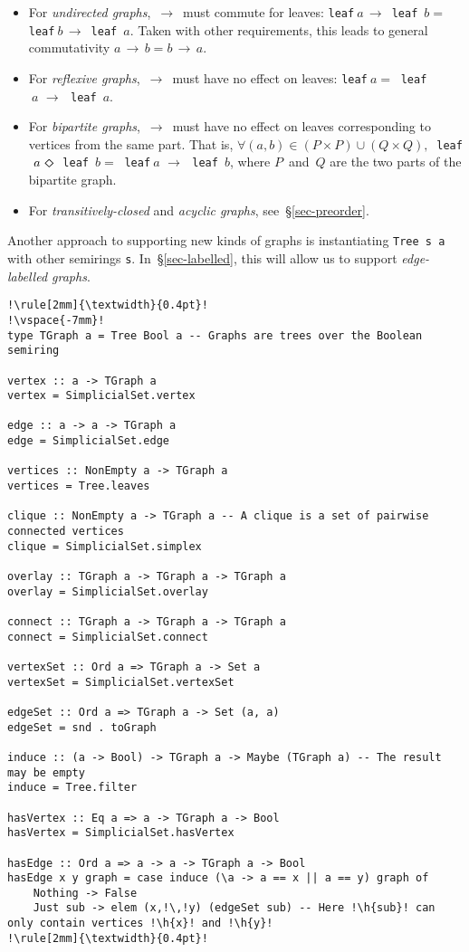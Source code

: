 \documentclass[crc,english]{programming}
\newcommand{\code}[1]{\lstinline[mathescape]|#1|}
\newcommand{\hcode}[1]{{\color{darkblue} \lstinline[keywordstyle={}]|#1|}} %
\newcommand{\h}[1]{{\itshape\color{grayblue}#1}} %
\newcommand{\dia}{\,\text{\raisebox{-0.3mm}{\Large $\diamond$}}\,}
\newcommand{\arr}{\,\text{$\rightarrow$}\,}
\begin{document}
\begin{itemize}
    \item For \emph{undirected graphs}, $\arr$ must commute for leaves:
    \hcode{leaf}$~a \arr $\hcode{leaf}~$b =~$\hcode{leaf}$~b \arr $\hcode{leaf}~$a$.
    Taken with other requirements, this leads to general commutativity
    $a \arr b = b \arr a$.
    \item For \emph{reflexive graphs}, $\arr$ must have no effect on leaves:
    \hcode{leaf}$~a =~$\hcode{leaf}$~a\,\arr\,$\hcode{leaf}~$a$.
    \item For \emph{bipartite graphs}, $\arr$ must have no effect on leaves
    corresponding to vertices from the same part. That is,
    $\forall (a,b) \in (P \times P) \cup (Q \times Q),\ $\hcode{leaf}$~a\,\dia\,$\hcode{leaf}~$b =~$\hcode{leaf}$~a\,\arr\,$\hcode{leaf}~$b$,
    where $P$~and~$Q$ are the two parts of the bipartite graph.
    \item For \emph{transitively-closed} and \emph{acyclic graphs},
    see~\S\ref{sec-preorder}.
\end{itemize}

\noindent
Another approach to supporting new kinds of graphs is instantiating
\hcode{Tree s a} with other semirings \hcode{s}. In~\S\ref{sec-labelled}, this
will allow us to support \emph{edge-labelled graphs}.

\begin{lstlisting}[float,label=lst-graph,xleftmargin=0pt,caption={
    Implementing a part of the \code{Algebra.G}\code{raph} API~\cite{mokhov_alga}
    with \hcode{Tree Bool a}.
}]
!\rule[2mm]{\textwidth}{0.4pt}!
!\vspace{-7mm}!
type TGraph a = Tree Bool a -- Graphs are trees over the Boolean semiring

vertex :: a -> TGraph a
vertex = SimplicialSet.vertex

edge :: a -> a -> TGraph a
edge = SimplicialSet.edge

vertices :: NonEmpty a -> TGraph a
vertices = Tree.leaves

clique :: NonEmpty a -> TGraph a -- A clique is a set of pairwise connected vertices
clique = SimplicialSet.simplex

overlay :: TGraph a -> TGraph a -> TGraph a
overlay = SimplicialSet.overlay

connect :: TGraph a -> TGraph a -> TGraph a
connect = SimplicialSet.connect

vertexSet :: Ord a => TGraph a -> Set a
vertexSet = SimplicialSet.vertexSet

edgeSet :: Ord a => TGraph a -> Set (a, a)
edgeSet = snd . toGraph

induce :: (a -> Bool) -> TGraph a -> Maybe (TGraph a) -- The result may be empty
induce = Tree.filter

hasVertex :: Eq a => a -> TGraph a -> Bool
hasVertex = SimplicialSet.hasVertex

hasEdge :: Ord a => a -> a -> TGraph a -> Bool
hasEdge x y graph = case induce (\a -> a == x || a == y) graph of
    Nothing -> False
    Just sub -> elem (x,!\,!y) (edgeSet sub) -- Here !\h{sub}! can only contain vertices !\h{x}! and !\h{y}!
!\rule[2mm]{\textwidth}{0.4pt}!
\end{lstlisting}
\end{document}
